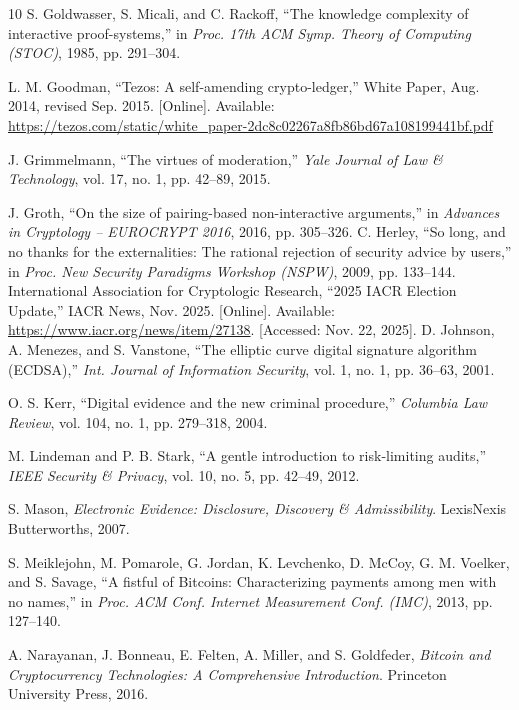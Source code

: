 \documentclass{ieeeaccess}
\begin{document}
\begin{thebibliography}{10}
S. Goldwasser, S. Micali, and C. Rackoff, ``The knowledge complexity of interactive proof-systems,'' in \emph{Proc. 17th ACM Symp. Theory of Computing (STOC)}, 1985, pp. 291--304.

L. M. Goodman, ``Tezos: A self-amending crypto-ledger,'' White Paper, Aug. 2014, revised Sep. 2015. [Online]. Available: \url{https://tezos.com/static/white_paper-2dc8c02267a8fb86bd67a108199441bf.pdf}

J. Grimmelmann, ``The virtues of moderation,'' \emph{Yale Journal of Law \& Technology}, vol. 17, no. 1, pp. 42--89, 2015.

J. Groth, ``On the size of pairing-based non-interactive arguments,'' in \emph{Advances in Cryptology -- EUROCRYPT 2016}, 2016, pp. 305--326.
C. Herley, ``So long, and no thanks for the externalities: The rational rejection of security advice by users,'' in \emph{Proc. New Security Paradigms Workshop (NSPW)}, 2009, pp. 133--144.
International Association for Cryptologic Research, ``2025 IACR Election Update,'' IACR News, Nov. 2025. [Online]. Available: \url{https://www.iacr.org/news/item/27138}. [Accessed: Nov. 22, 2025].
D. Johnson, A. Menezes, and S. Vanstone, ``The elliptic curve digital signature algorithm (ECDSA),'' \emph{Int. Journal of Information Security}, vol. 1, no. 1, pp. 36--63, 2001.

O. S. Kerr, ``Digital evidence and the new criminal procedure,'' \emph{Columbia Law Review}, vol. 104, no. 1, pp. 279--318, 2004.

M. Lindeman and P. B. Stark, ``A gentle introduction to risk-limiting audits,'' \emph{IEEE Security \& Privacy}, vol. 10, no. 5, pp. 42--49, 2012.

S. Mason, \emph{Electronic Evidence: Disclosure, Discovery \& Admissibility}. LexisNexis Butterworths, 2007.

S. Meiklejohn, M. Pomarole, G. Jordan, K. Levchenko, D. McCoy, G. M. Voelker, and S. Savage, ``A fistful of Bitcoins: Characterizing payments among men with no names,'' in \emph{Proc. ACM Conf. Internet Measurement Conf. (IMC)}, 2013, pp. 127--140.

A. Narayanan, J. Bonneau, E. Felten, A. Miller, and S. Goldfeder, \emph{Bitcoin and Cryptocurrency Technologies: A Comprehensive Introduction}. Princeton University Press, 2016.


\end{thebibliography}
\end{document}
